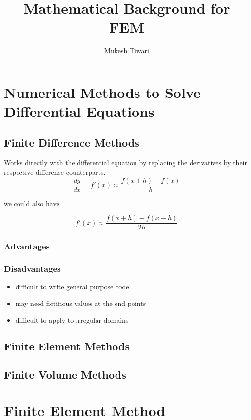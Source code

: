 \documentclass[12pt,a4paper]{article}
\title{Mathematical Background for FEM}
\author{Mukesh Tiwari}
\begin{document}
	\maketitle
	
	\section{Numerical Methods to Solve Differential Equations}
	
	\subsection{Finite Difference Methods}
		Works directly with the differential equation by replacing the derivatives by their respective difference counterparts.
		\[ \frac{dy}{dx} = f'(x) \approx \frac{f(x+h)-f(x)}{h} \]
		
		we could also have 
		
		\[ f'(x)\approx\frac{f(x+h)-f(x-h)}{2h} \]
		
		\subsubsection{Advantages}
		
		
		\subsubsection{Disadvantages}
		
	\begin{itemize}
		\item difficult to write general purpose code
		\item may need fictitious values at the end points
		\item difficult to apply to irregular domains
	\end{itemize}
		
		
	\subsection{Finite Element Methods}
	
	
	\subsection{Finite Volume Methods}
	
	\section{Finite Element Method}
	
\end{document}
